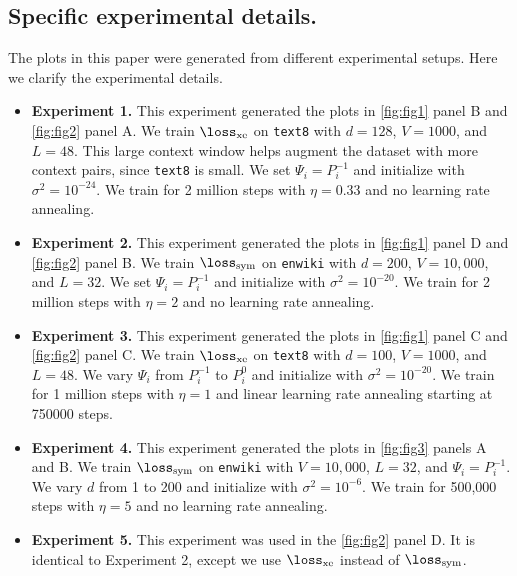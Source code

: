 \newpage
\subsection{Specific experimental details.}

The plots in this paper were generated from different experimental setups. Here we clarify the experimental details.

\begin{itemize}
    \item \textbf{Experiment 1.} This experiment generated the plots in \cref{fig:fig1} panel B and \cref{fig:fig2} panel A. We train $\lossxe$ on \texttt{text8} with $d=128$, $V=1000$, and $L=48$. This large context window helps augment the dataset with more context pairs, since \texttt{text8} is small. We set $\Psi_i=P_i^{-1}$ and initialize with $\sigma^2=10^{-24}$. We train for 2 million steps with $\eta=0.33$ and no learning rate annealing.
    
    \item \textbf{Experiment 2.} This experiment generated the plots in \cref{fig:fig1} panel D and \cref{fig:fig2} panel B. We train $\losssym$ on \texttt{enwiki} with $d=200$, $V=10,000$, and $L=32$. We set $\Psi_i=P_i^{-1}$ and initialize with $\sigma^2=10^{-20}$. We train for 2 million steps with $\eta=2$ and no learning rate annealing. 
    
    \item \textbf{Experiment 3.} This experiment generated the plots in \cref{fig:fig1} panel C and \cref{fig:fig2} panel C. We train $\lossxe$ on \texttt{text8} with $d=100$, $V=1000$, and $L=48$. We vary $\Psi_i$ from $P_i^{-1}$ to $P_i^0$ and initialize with $\sigma^2=10^{-20}$. We train for 1 million steps with $\eta=1$ and linear learning rate annealing starting at 750000 steps. 
    
    \item \textbf{Experiment 4.} This experiment generated the plots in \cref{fig:fig3} panels A and B. We train $\losssym$ on \texttt{enwiki} with $V=10,000$, $L=32$, and $\Psi_i=P_i^{-1}$. We vary $d$ from 1 to 200 and initialize with $\sigma^2=10^{-6}$. We train for 500,000 steps with $\eta=5$ and no learning rate annealing. 
    
    \item \textbf{Experiment 5.} This experiment was used in the \cref{fig:fig2} panel D. It is identical to Experiment 2, except we use $\lossxe$ instead of $\losssym$.
\end{itemize}

